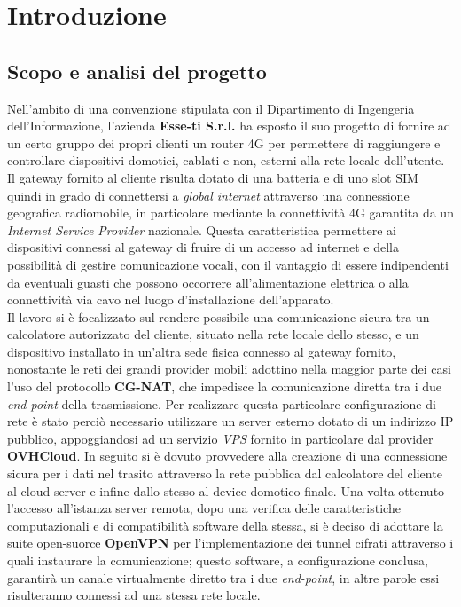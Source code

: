 \chapter{Introduzione}
\setlength{\parskip}{1em}
\setlength{\parindent}{0em}
\renewcommand{\baselinestretch}{1.15}
\section{Scopo e analisi del progetto} \label{Scopo_e_analisi_del_progetto}

Nell'ambito di una convenzione stipulata con il Dipartimento di Ingengeria dell'Informazione, l'azienda \textbf{Esse-ti S.r.l.} ha esposto il suo progetto di fornire ad un certo gruppo dei propri clienti un router 4G per permettere di raggiungere e controllare dispositivi domotici, cablati e non, esterni alla rete locale dell'utente.
Il gateway fornito al cliente risulta dotato di una batteria e di uno slot SIM  quindi in grado di connettersi a \textit{global internet} attraverso una connessione geografica radiomobile, in particolare mediante la connettività 4G garantita da un \textit{Internet Service Provider} nazionale. Questa caratteristica permettere ai dispositivi connessi al gateway di fruire di un accesso ad internet e della possibilità di gestire comunicazione vocali, con il vantaggio di essere indipendenti da eventuali guasti che possono occorrere all'alimentazione elettrica o alla connettività via cavo nel luogo d'installazione dell'apparato.\\
Il lavoro si è focalizzato sul rendere possibile una comunicazione sicura tra un calcolatore autorizzato del cliente, situato nella rete locale dello stesso, e un dispositivo installato in un'altra sede fisica connesso al gateway fornito, nonostante le reti dei grandi provider mobili adottino nella maggior parte dei casi l'uso del protocollo \textbf{CG-NAT}, che impedisce la comunicazione diretta tra i due \textit{end-point} della trasmissione.
Per realizzare questa particolare configurazione di rete è stato perciò necessario utilizzare un server esterno dotato di un indirizzo IP pubblico, appoggiandosi ad un servizio \textit{VPS} fornito in particolare dal provider \textbf{OVHCloud}. In seguito si è dovuto provvedere alla creazione di una connessione sicura per i dati nel trasito attraverso la rete pubblica dal calcolatore del cliente al cloud server e infine dallo stesso al device domotico finale.
Una volta ottenuto l'accesso all'istanza server remota, dopo una verifica delle caratteristiche computazionali e di compatibilità software della stessa, si è deciso di adottare la suite open-suorce \textbf{OpenVPN} per l'implementazione dei tunnel cifrati attraverso i quali instaurare la comunicazione; questo software, a configurazione conclusa, garantirà un canale virtualmente diretto tra i due \textit{end-point}, in altre parole essi risulteranno connessi ad una stessa rete locale.

